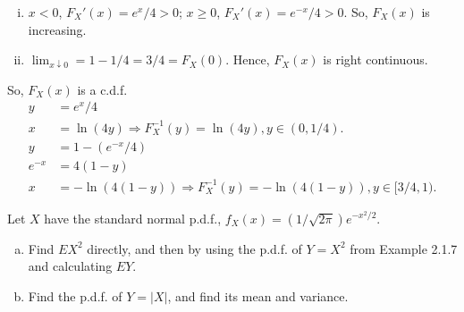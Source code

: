\documentclass[14pt]{elegantbook}
\begin{document}
\begin{solution}
\begin{enumerate}[(a)]
\begin{enumerate}[i)]
                \item $x<0$, $F_X'(x)=e^x/4>0$; $ x\geq 0$, $F_X'(x)=e^{-x}/4>0$. So, $F_X(x)$ is increasing. 
                \item $\lim_{x\downarrow 0}=1-1/4=3/4=F_X(0)$. Hence, $F_X(x)$ is right continuous. 
              \end{enumerate}
              So, $F_X(x)$ is a c.d.f. 
              \begin{align*}
                y&=e^x/4\\
                x&=\ln(4y)\Rightarrow F_X^{-1}(y)=\ln(4y), y\in(0,1/4). \\
                y&=1-(e^{-x}/4)\\
                e^{-x}&=4(1-y)\\
                x&=-\ln(4(1-y))\Rightarrow F_X^{-1}(y)=-\ln(4(1-y)), y\in[3/4,1).
              \end{align*}
        \end{enumerate}
    \end{solution}

    \setcounter{exer}{10}
    \begin{exercise}
        Let $X$ have the standard normal p.d.f., $f_X(x)=(1/\sqrt{2\pi})e^{-x^2/2}$. 
        \begin{enumerate}[(a)]
            \item Find $EX^2$ directly, and then by using the p.d.f. of $Y=X^2$ from Example 2.1.7 and calculating $EY$. 
            \item Find the p.d.f. of $Y=|X|$, and find its mean and variance. 
        \end{enumerate}
    \end{exercise}
\end{document}
